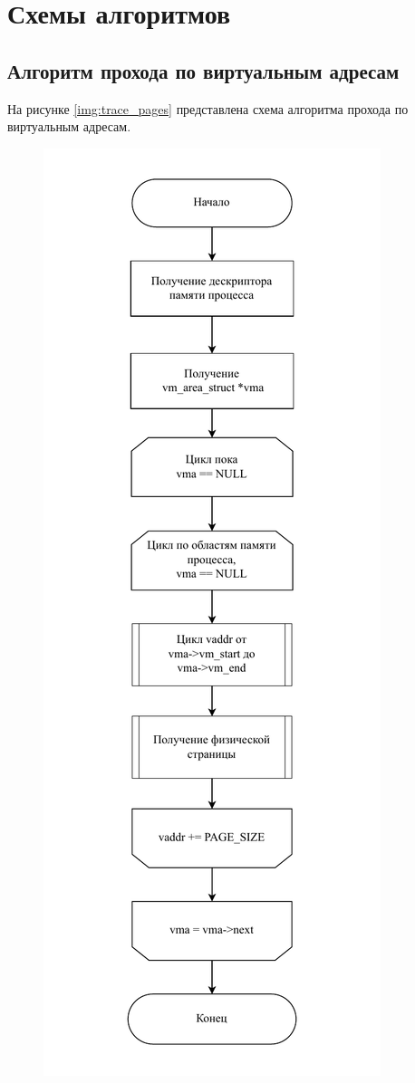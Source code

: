 \section{Схемы алгоритмов}

\subsection{Алгоритм прохода по виртуальным адресам}

На рисунке \ref{img:trace_pages} представлена схема алгоритма прохода по виртуальным адресам.

\begin{figure}[H]
	\begin{center}
		\includegraphics[scale=0.7]{inc/img/trace_pages.pdf}

\end{center}
\end{figure}

